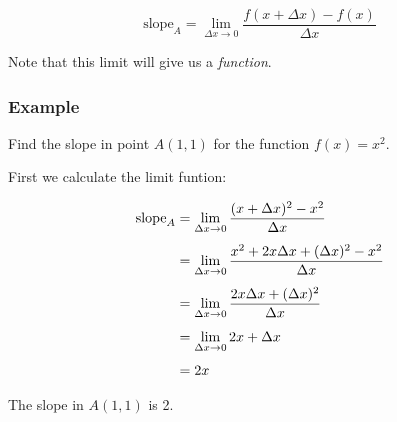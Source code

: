 \documentclass{article}
\begin{document}
\begin{equation}
\textrm{slope}_A = \lim\limits_{\Delta x \rightarrow 0} \frac{f(x+\Delta x) - f(x)}{\Delta x}
\end{equation}

Note that this limit will give us a \emph{function}.



\subsubsection*{Example}
Find the slope in point $A(1,1)$ for the function $f(x) = x^2$.

First we calculate the limit funtion:

\begin{equation}
\jot=7pt
\begin{split}
\mathrm{slope}_A &= \lim\limits_{\Delta x \rightarrow 0}\frac{(x+\Delta x)^2 - x^2}{\Delta x} \\
 &= \lim\limits_{\Delta x \rightarrow 0}\frac{x^2 + 2x\Delta x + (\Delta x)^2 - x^2}{\Delta x} \\
 &= \lim\limits_{\Delta x \rightarrow 0}\frac{2x\Delta x + (\Delta x)^2}{\Delta x} \\
 &= \lim\limits_{\Delta x \rightarrow 0}2x + \Delta x \\
 &= 2x 
\end{split}
\end{equation}

The slope in $A(1,1)$ is 2.
\end{document}
